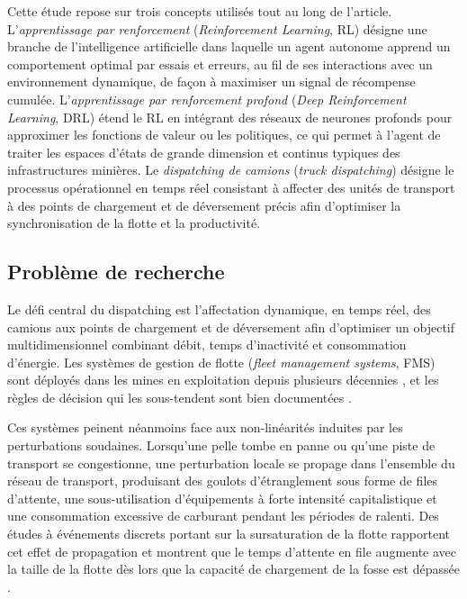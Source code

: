 \documentclass[11pt,a4paper]{article}
\begin{document}
Cette étude repose sur trois concepts utilisés tout au long de l'article. L'\textit{apprentissage par renforcement} (\textit{Reinforcement Learning}, RL) désigne une branche de l'intelligence artificielle dans laquelle un agent autonome apprend un comportement optimal par essais et erreurs, au fil de ses interactions avec un environnement dynamique, de façon à maximiser un signal de récompense cumulée. L'\textit{apprentissage par renforcement profond} (\textit{Deep Reinforcement Learning}, DRL) étend le RL en intégrant des réseaux de neurones profonds pour approximer les fonctions de valeur ou les politiques, ce qui permet à l'agent de traiter les espaces d'états de grande dimension et continus typiques des infrastructures minières. Le \textit{dispatching de camions} (\textit{truck dispatching}) désigne le processus opérationnel en temps réel consistant à affecter des unités de transport à des points de chargement et de déversement précis afin d'optimiser la synchronisation de la flotte et la productivité.

\subsection{Problème de recherche}
\label{sec:problem-statement}

Le défi central du dispatching est l'affectation dynamique, en temps réel, des camions aux points de chargement et de déversement afin d'optimiser un objectif multidimensionnel combinant débit, temps d'inactivité et consommation d'énergie. Les systèmes de gestion de flotte (\textit{fleet management systems}, FMS) sont déployés dans les mines en exploitation depuis plusieurs décennies \cite{Afrapoli2017, AlexandraNewman2010}, et les règles de décision qui les sous-tendent sont bien documentées \cite{MohanMunirathinam1994, Alarie2002}.

Ces systèmes peinent néanmoins face aux non-linéarités induites par les perturbations soudaines. Lorsqu'une pelle tombe en panne ou qu'une piste de transport se congestionne, une perturbation locale se propage dans l'ensemble du réseau de transport, produisant des goulots d'étranglement sous forme de files d'attente, une sous-utilisation d'équipements à forte intensité capitalistique et une consommation excessive de carburant pendant les périodes de ralenti. Des études à événements discrets portant sur la sursaturation de la flotte rapportent cet effet de propagation et montrent que le temps d'attente en file augmente avec la taille de la flotte dès lors que la capacité de chargement de la fosse est dépassée \cite{Zeng2022, NecmettinCetin2004}.
\end{document}
